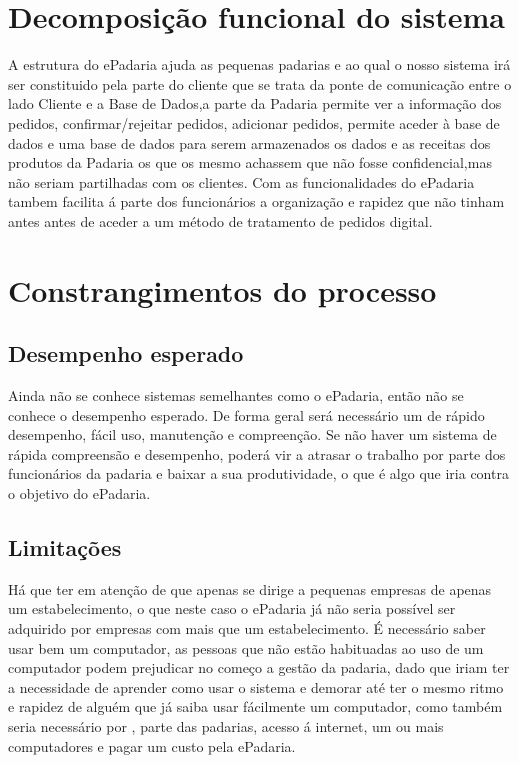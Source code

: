 \section{Decomposição funcional do sistema}


A estrutura do ePadaria ajuda as pequenas padarias e ao qual o nosso sistema irá ser constituido pela parte do cliente que se trata da ponte de comunicação entre o lado Cliente e a Base de Dados,a parte da Padaria permite ver a informação dos pedidos, confirmar/rejeitar pedidos, adicionar pedidos, permite aceder à base de dados e uma base de dados para serem armazenados os dados e as receitas dos produtos da Padaria os que os mesmo achassem que não fosse confidencial,mas não seriam partilhadas com os clientes. Com as funcionalidades do ePadaria tambem facilita á parte dos funcionários a organização e rapidez que não tinham antes antes de aceder a um método de tratamento de pedidos digital.

\section{Constrangimentos do processo}
\subsection{Desempenho esperado}
Ainda não se conhece sistemas semelhantes como o ePadaria, então não se conhece o desempenho esperado. De forma geral será necessário um de rápido desempenho, fácil uso, manutenção e compreenção. Se não haver um sistema de rápida compreensão e desempenho, poderá vir a atrasar o trabalho por parte dos funcionários da padaria e baixar a sua produtividade, o que é algo que iria contra o objetivo do ePadaria.

\subsection{Limitações} 
Há que ter em atenção de que apenas se dirige a pequenas empresas de apenas um estabelecimento, o que neste caso o ePadaria já não seria possível ser adquirido por empresas com mais que um estabelecimento. É necessário saber usar bem um computador, as pessoas que não estão habituadas ao uso de um computador podem prejudicar no começo a gestão da padaria, dado que iriam ter a necessidade de aprender como usar o sistema e demorar até ter o mesmo ritmo e rapidez de alguém que já saiba usar fácilmente um computador, como também seria necessário por , parte das padarias, acesso á internet, um ou mais computadores e pagar um custo pela ePadaria.\\
